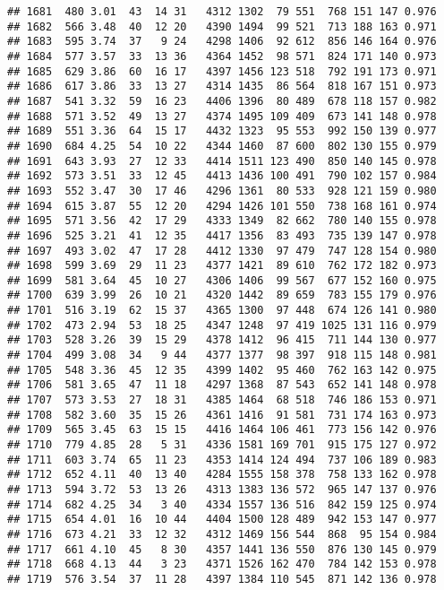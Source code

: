 \documentclass[]{article}
\begin{document}
\begin{verbatim}
## 1681  480 3.01  43  14 31   4312 1302  79 551  768 151 147 0.976
## 1682  566 3.48  40  12 20   4390 1494  99 521  713 188 163 0.971
## 1683  595 3.74  37   9 24   4298 1406  92 612  856 146 164 0.976
## 1684  577 3.57  33  13 36   4364 1452  98 571  824 171 140 0.973
## 1685  629 3.86  60  16 17   4397 1456 123 518  792 191 173 0.971
## 1686  617 3.86  33  13 27   4314 1435  86 564  818 167 151 0.973
## 1687  541 3.32  59  16 23   4406 1396  80 489  678 118 157 0.982
## 1688  571 3.52  49  13 27   4374 1495 109 409  673 141 148 0.978
## 1689  551 3.36  64  15 17   4432 1323  95 553  992 150 139 0.977
## 1690  684 4.25  54  10 22   4344 1460  87 600  802 130 155 0.979
## 1691  643 3.93  27  12 33   4414 1511 123 490  850 140 145 0.978
## 1692  573 3.51  33  12 45   4413 1436 100 491  790 102 157 0.984
## 1693  552 3.47  30  17 46   4296 1361  80 533  928 121 159 0.980
## 1694  615 3.87  55  12 20   4294 1426 101 550  738 168 161 0.974
## 1695  571 3.56  42  17 29   4333 1349  82 662  780 140 155 0.978
## 1696  525 3.21  41  12 35   4417 1356  83 493  735 139 147 0.978
## 1697  493 3.02  47  17 28   4412 1330  97 479  747 128 154 0.980
## 1698  599 3.69  29  11 23   4377 1421  89 610  762 172 182 0.973
## 1699  581 3.64  45  10 27   4306 1406  99 567  677 152 160 0.975
## 1700  639 3.99  26  10 21   4320 1442  89 659  783 155 179 0.976
## 1701  516 3.19  62  15 37   4365 1300  97 448  674 126 141 0.980
## 1702  473 2.94  53  18 25   4347 1248  97 419 1025 131 116 0.979
## 1703  528 3.26  39  15 29   4378 1412  96 415  711 144 130 0.977
## 1704  499 3.08  34   9 44   4377 1377  98 397  918 115 148 0.981
## 1705  548 3.36  45  12 35   4399 1402  95 460  762 163 142 0.975
## 1706  581 3.65  47  11 18   4297 1368  87 543  652 141 148 0.978
## 1707  573 3.53  27  18 31   4385 1464  68 518  746 186 153 0.971
## 1708  582 3.60  35  15 26   4361 1416  91 581  731 174 163 0.973
## 1709  565 3.45  63  15 15   4416 1464 106 461  773 156 142 0.976
## 1710  779 4.85  28   5 31   4336 1581 169 701  915 175 127 0.972
## 1711  603 3.74  65  11 23   4353 1414 124 494  737 106 189 0.983
## 1712  652 4.11  40  13 40   4284 1555 158 378  758 133 162 0.978
## 1713  594 3.72  53  13 26   4313 1383 136 572  965 147 137 0.976
## 1714  682 4.25  34   3 40   4334 1557 136 516  842 159 125 0.974
## 1715  654 4.01  16  10 44   4404 1500 128 489  942 153 147 0.977
## 1716  673 4.21  33  12 32   4312 1469 156 544  868  95 154 0.984
## 1717  661 4.10  45   8 30   4357 1441 136 550  876 130 145 0.979
## 1718  668 4.13  44   3 23   4371 1526 162 470  784 142 153 0.978
## 1719  576 3.54  37  11 28   4397 1384 110 545  871 142 136 0.978

\end{verbatim}
\end{document}
